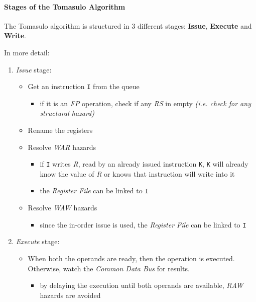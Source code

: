 \documentclass[english]{article}
\begin{document}
\paragraph{Stages of the Tomasulo Algorithm}

The Tomasulo algorithm is structured in \(3\) different stages: \textbf{Issue}, \textbf{Execute} and \textbf{Write}.

\bigskip
In more detail:

\begin{enumerate}
  \item \textit{Issue} stage:
        \begin{itemize}
          \item Get an instruction \texttt{I} from the queue
                \begin{itemize}
                  \item if it is an \textit{FP} operation, check if any \textit{RS} in empty \textit{(i.e. check for any structural hazard)}
                \end{itemize}
          \item Rename the registers
          \item Resolve \textit{WAR} hazards
                \begin{itemize}
                  \item if \texttt{I} writes \textit{R}, read by an already issued instruction \texttt{K}, \texttt{K} will already know the value of \textit{R} or knows that instruction will write into it
                  \item the \textit{Register File} can be linked to \texttt{I}
                \end{itemize}
          \item Resolve \textit{WAW} hazards
                \begin{itemize}
                  \item since the in-order issue is used, the \textit{Register File} can be linked to \texttt{I}
                \end{itemize}
        \end{itemize}
  \item \textit{Execute} stage:
        \begin{itemize}
          \item When both the operands are ready, then the operation is executed. Otherwise, watch the \textit{Common Data Bus} for results.
                \begin{itemize}
                  \item by delaying the execution until both operands are available, \textit{RAW} hazards are avoided

\end{itemize}
\end{itemize}
\end{enumerate}
\end{document}
